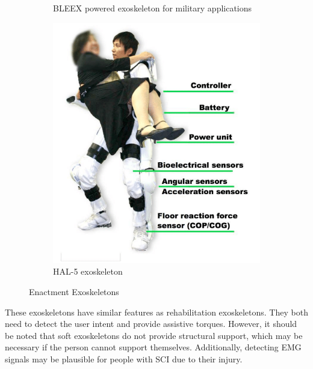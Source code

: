 \begin{figure}
\begin{subfigure}{0.3\textwidth}
    \caption[BLEEX]{BLEEX powered exoskeleton for military applications \cite{kazerooni2006hybrid}}
    \label{fig:BLEEX}
     \end{subfigure}
     \begin{subfigure}{\textwidth}
           \centering
            \includegraphics[width=.45\linewidth]{images/background/HAL-5.png}
        \caption[HAL-5]{HAL-5 exoskeleton \cite{sankai2010hal}}
    \label{fig:HAL5}
     \end{subfigure}
        \caption{Enactment Exoskeletons}
        \label{fig:enhanceExos}
\end{figure}

These exoskeletons have similar features as rehabilitation exoskeletons. They both need to detect the user intent and provide assistive torques. However, it should be noted that soft exoskeletons do not provide structural support, which may be necessary if the person cannot support themselves. Additionally, detecting EMG signals may be plausible for people with SCI due to their injury.